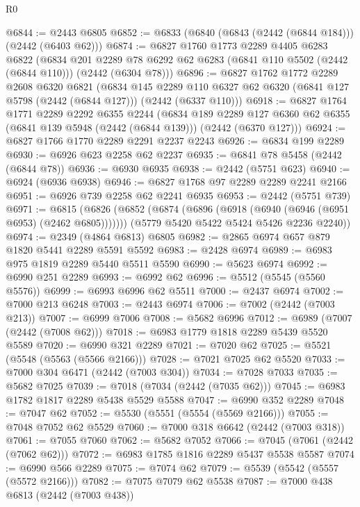 \begin{lexlean}{R0}
\begin{coremodule}
@6844 := @2443 @6805
@6852 := @6833 (@6840 (@6843 (@2442 (@6844 @184))) (@2442 (@6403 @62)))
@6874 := @6827
    @1760
    @1773
    @2289
    @4405
    @6283
    @6822
    (@6834
      @201
      @2289
      @78
      @6292
      @62
      @6283
      (@6841 @110 @5502 (@2442 (@6844 @110)))
      (@2442 (@6304 @78)))
@6896 := @6827
    @1762
    @1772
    @2289
    @2608
    @6320
    @6821
    (@6834
      @145
      @2289
      @110
      @6327
      @62
      @6320
      (@6841 @127 @5798 (@2442 (@6844 @127)))
      (@2442 (@6337 @110)))
@6918 := @6827
    @1764
    @1771
    @2289
    @2292
    @6355
    @2244
    (@6834
      @189
      @2289
      @127
      @6360
      @62
      @6355
      (@6841 @139 @5948 (@2442 (@6844 @139)))
      (@2442 (@6370 @127)))
@6924 := @6827 @1766 @1770 @2289 @2291 @2237 @2243
@6926 := @6834 @199 @2289
@6930 := @6926 @623 @2258 @62 @2237
@6935 := @6841 @78 @5458 (@2442 (@6844 @78))
@6936 := @6930 @6935
@6938 := @2442 (@5751 @623)
@6940 := @6924 (@6936 @6938)
@6946 := @6827 @1768 @97 @2289 @2289 @2241 @2166
@6951 := @6926 @739 @2258 @62 @2241 @6935
@6953 := @2442 (@5751 @739)
@6971 := @6815
    (@6826
      (@6852 (@6874 (@6896 (@6918 (@6940 (@6946 (@6951 @6953) (@2462 @6805)))))))
      (@5779 @5420 @5422 @5424 @5426 @2236 @2240))
@6974 := @2349 (@4864 @6813) @6805
@6982 := @2865 @6974 @657 @879 @1820 @5441 @2289 @5591 @5592
@6983 := @2428 @6974
@6989 := @6983 @975 @1819 @2289 @5440 @5511 @5590
@6990 := @5623 @6974
@6992 := @6990 @251 @2289
@6993 := @6992 @62
@6996 := @5512 (@5545 (@5560 @5576))
@6999 := @6993 @6996 @62 @5511
@7000 := @2437 @6974
@7002 := @7000 @213 @6248
@7003 := @2443 @6974
@7006 := @7002 (@2442 (@7003 @213))
@7007 := @6999 @7006
@7008 := @5682 @6996
@7012 := @6989 (@7007 (@2442 (@7008 @62)))
@7018 := @6983 @1779 @1818 @2289 @5439 @5520 @5589
@7020 := @6990 @321 @2289
@7021 := @7020 @62
@7025 := @5521 (@5548 (@5563 (@5566 @2166)))
@7028 := @7021 @7025 @62 @5520
@7033 := @7000 @304 @6471 (@2442 (@7003 @304))
@7034 := @7028 @7033
@7035 := @5682 @7025
@7039 := @7018 (@7034 (@2442 (@7035 @62)))
@7045 := @6983 @1782 @1817 @2289 @5438 @5529 @5588
@7047 := @6990 @352 @2289
@7048 := @7047 @62
@7052 := @5530 (@5551 (@5554 (@5569 @2166)))
@7055 := @7048 @7052 @62 @5529
@7060 := @7000 @318 @6642 (@2442 (@7003 @318))
@7061 := @7055 @7060
@7062 := @5682 @7052
@7066 := @7045 (@7061 (@2442 (@7062 @62)))
@7072 := @6983 @1785 @1816 @2289 @5437 @5538 @5587
@7074 := @6990 @566 @2289
@7075 := @7074 @62
@7079 := @5539 (@5542 (@5557 (@5572 @2166)))
@7082 := @7075 @7079 @62 @5538
@7087 := @7000 @438 @6813 (@2442 (@7003 @438))

\end{coremodule}
\end{lexlean}
